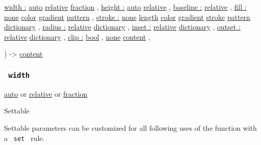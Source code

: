 { \hyperref[parameters-width]{width :}
\href{/docs/reference/foundations/auto/}{auto}
\href{/docs/reference/layout/relative/}{relative}
\href{/docs/reference/layout/fraction/}{fraction} , } {
\hyperref[parameters-height]{height :}
\href{/docs/reference/foundations/auto/}{auto}
\href{/docs/reference/layout/relative/}{relative} , } {
\hyperref[parameters-baseline]{baseline :}
\href{/docs/reference/layout/relative/}{relative} , } {
\hyperref[parameters-fill]{fill :}
\href{/docs/reference/foundations/none/}{none}
\href{/docs/reference/visualize/color/}{color}
\href{/docs/reference/visualize/gradient/}{gradient}
\href{/docs/reference/visualize/pattern/}{pattern} , } {
\hyperref[parameters-stroke]{stroke :}
\href{/docs/reference/foundations/none/}{none}
\href{/docs/reference/layout/length/}{length}
\href{/docs/reference/visualize/color/}{color}
\href{/docs/reference/visualize/gradient/}{gradient}
\href{/docs/reference/visualize/stroke/}{stroke}
\href{/docs/reference/visualize/pattern/}{pattern}
\href{/docs/reference/foundations/dictionary/}{dictionary} , } {
\hyperref[parameters-radius]{radius :}
\href{/docs/reference/layout/relative/}{relative}
\href{/docs/reference/foundations/dictionary/}{dictionary} , } {
\hyperref[parameters-inset]{inset :}
\href{/docs/reference/layout/relative/}{relative}
\href{/docs/reference/foundations/dictionary/}{dictionary} , } {
\hyperref[parameters-outset]{outset :}
\href{/docs/reference/layout/relative/}{relative}
\href{/docs/reference/foundations/dictionary/}{dictionary} , } {
\hyperref[parameters-clip]{clip :}
\href{/docs/reference/foundations/bool/}{bool} , } {
\hyperref[parameters-body]{}
\href{/docs/reference/foundations/none/}{none}
\href{/docs/reference/foundations/content/}{content} , }

) -\textgreater{} \href{/docs/reference/foundations/content/}{content}

\subsubsection{\texorpdfstring{\texttt{\ width\ }}{ width }}\label{parameters-width}

\href{/docs/reference/foundations/auto/}{auto} {or}
\href{/docs/reference/layout/relative/}{relative} {or}
\href{/docs/reference/layout/fraction/}{fraction}

{{ Settable }}

\label{parameters-width-settable-tooltip}
Settable parameters can be customized for all following uses of the
function with a \texttt{\ set\ } rule.

